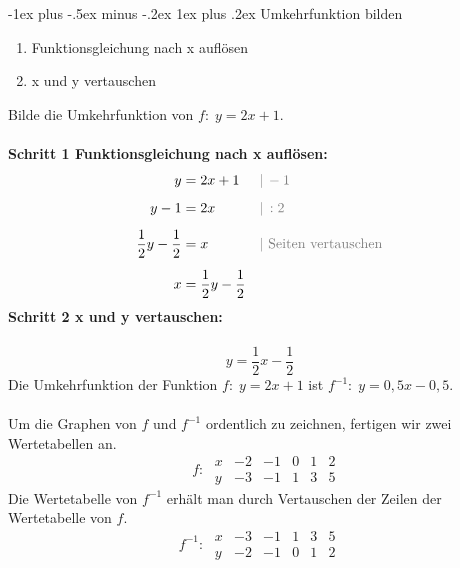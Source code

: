\documentclass[10pt,landscape]{article}
\makeatletter
\renewcommand{\subsubsection}{\@startsection{subsubsection}{3}{0mm}%
                                {-1ex plus -.5ex minus -.2ex}%
                                {1ex plus .2ex}%
                                {\normalfont\small\bfseries}}
\makeatother
\begin{document}
\begin{multicols}{3}
    \subsubsection{Umkehrfunktion bilden}
    \begin{enumerate}
        \item Funktionsgleichung nach x auflösen
        \item x und y vertauschen
    \end{enumerate}
    Bilde die Umkehrfunktion von $f\colon\; y = 2x + 1$.\\~\\
    \textbf{Schritt 1 Funktionsgleichung nach x auflösen:}
    \begin{align*} y &= 2x + 1 &&{\color{gray}|\, -1} \\[5px] y - 1 &= 2x &&{\color{gray}|\, :2} \\[5px] \frac{1}{2}y - \frac{1}{2} &= x &&{\color{gray}| \text{ Seiten vertauschen}} \\[5px] x &= \frac{1}{2}y - \frac{1}{2} \end{align*}
    \textbf{Schritt 2 x und y vertauschen:}\\~\\
    \[ y = \frac{1}{2}x - \frac{1}{2}\]
    Die Umkehrfunktion der Funktion $f\colon\; y = 2x + 1$ ist $f^{-1}\colon\; y = 0{,}5x - 0{,}5$.\\~\\
    Um die Graphen von $f$ und $f^{-1}$ ordentlich zu zeichnen, fertigen wir zwei Wertetabellen an.
    \[\phantom{^{-1}}f\colon\; \begin{array}{r|c|c|c|c|c} x & -2 & -1 & 0 & 1 & 2 \\ \hline y & -3 & -1 & 1 & 3 & 5 \end{array}\]
    Die Wertetabelle von $f^{-1}$ erhält man durch Vertauschen der Zeilen der Wertetabelle von  $f$.
    \[f^{-1}\colon\; \begin{array}{r|c|c|c|c|c} x & -3 & -1 & 1 & 3 & 5 \\ \hline y & -2 & -1 & 0 & 1 & 2 \end{array}\]




\end{multicols}
\end{document}
